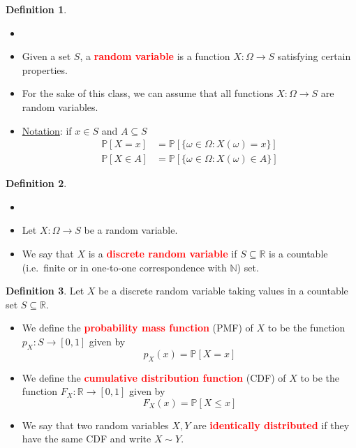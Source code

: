 \documentclass{article}
\newcommand{\PP}{\mathbb{P}}
\newcommand{\R}{\mathbb{R}}
\newcommand{\N}{\mathbb{N}}
\newcommand{\bfred}[1]{\textcolor{red}{\textbf{#1}}}
\theoremstyle{plain}
\theoremstyle{definition}
\newtheorem{defn}{Definition}[section]
\theoremstyle{remark}
\begin{document}
\begin{defn}
    \begin{itemize}
        \item []
        \item Given a set $S$, a \bfred{random variable} is a function $X: \Omega \rightarrow S$ satisfying certain properties.
        \item For the sake of this class, we can assume that all functions $X: \Omega \rightarrow S$ are random variables.
        \item \underline{Notation}: if $x \in S$ and $A \subseteq S$ 
        \begin{align*}
            \PP[X = x] &= \PP[\{\omega \in \Omega : X(\omega) = x\}] \\
            \PP[X \in A] &= \PP[\{\omega \in \Omega : X(\omega) \in A\}]
        \end{align*}
    \end{itemize}
\end{defn}

\begin{defn}
    \begin{itemize}
        \item []
        \item Let $X: \Omega \rightarrow S$ be a random variable.
        \item We say that $X$ is a \bfred{discrete random variable} if $S \subseteq \R$ is a countable (i.e.\ finite or in one-to-one correspondence with $\N$) set.
    \end{itemize}
\end{defn}

\begin{defn}
    Let $X$ be a discrete random variable taking values in a countable set $S \subseteq \R$.
    \begin{itemize}
        \item We define the \bfred{probability mass function} (PMF) of $X$ to be the function $p_X: S \rightarrow [0, 1]$ given by \[p_X(x) = \PP[X = x]\]
        \item We define the \bfred{cumulative distribution function} (CDF) of $X$ to be the function $F_X: \R \rightarrow [0, 1]$ given by \[F_X(x) = \PP[X \leq x]\] 
        \item We say that two random variables $X, Y$ are \bfred{identically distributed} if they have the same CDF and write $X \sim Y$.
    \end{itemize}
\end{defn}
\end{document}
